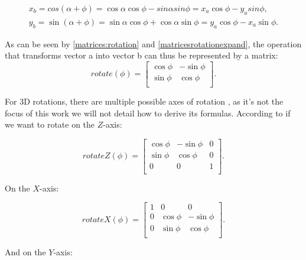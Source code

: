 \documentclass[cic,tc,english]{iiufrgs}
\begin{document}
\begin{equation}
    \begin{array}{c}
        x_b = cos(\alpha + \phi) = \cos\alpha \cos\phi - sin\alpha sin\phi = x_a \cos\phi - y_a sin\phi, \\
        y_b = \sin(\alpha + \phi) = \sin\alpha \cos\phi + \cos\alpha \sin\phi = y_a \cos\phi - x_a \sin\phi.
    \end{array}
    \label{matricesrotationexpand}
\end{equation}

As can be seen by \cref{matrices:rotation} and \cref{matricesrotationexpand}, the operation that transforms vector a into vector b can thus be represented by a matrix:
\begin{equation}
    rotate(\phi)=
    \begin{bmatrix}
        \cos\phi & -\sin\phi \\
        \sin\phi & \cos\phi \\
    \end{bmatrix}
    .
\end{equation}

For 3D rotations, there are multiple possible axes of rotation \cite{Marschner2021CGFundamentals}, as it's not the focus of this work we will not detail how to derive its formulas. According to \citet{Marschner2021CGFundamentals} if we want to rotate on the $Z$-axis:

\begin{equation}
    rotateZ(\phi)=
    \begin{bmatrix}
        \cos\phi & -\sin\phi & 0 \\
        \sin\phi & \cos\phi & 0 \\
        0 & 0 & 1 \\
    \end{bmatrix}
    .
\end{equation}

On the $X$-axis:

\begin{equation}
    rotateX(\phi)=
    \begin{bmatrix}
        1 & 0 & 0 \\
        0 & \cos\phi & -\sin\phi \\
        0 & \sin\phi & \cos\phi  \\
    \end{bmatrix}
    .
\end{equation}

And on the $Y$-axis:
\end{document}
